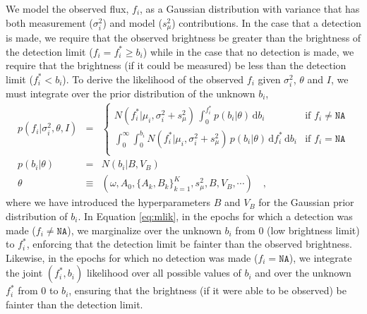 \documentclass[12pt,preprint]{aastex}
\newcommand{\dd}{\mathrm{d}}
\newcommand{\fobs}{f_i}
\newcommand{\ftrue}{f_i^*}
\begin{document}
We model the observed flux, $\fobs$, as a Gaussian distribution with variance that has both measurement ($\sigma^2_i$) and model ($s^2_{\mu}$) contributions.  In the case that a detection is made, we require that the observed brightness be greater than the brightness of the detection limit ($\fobs = \ftrue \ge b_i$) while in the case that no detection is made, we require that the brightness (if it could be measured) be less than the detection limit ($\ftrue < b_i$).  To derive the likelihood of the observed $\fobs$ given $\sigma^2_i$, $\theta$ and $I$, we must integrate over the prior distribution of the unknown $b_i$,
\begin{eqnarray}\displaystyle
p(\fobs |\sigma^2_i,\theta,I) &=& \left\{\begin{array}{ll}
  N(\ftrue | \mu_i,  \sigma^2_i + s^2_{\mu})\,  \int_0^{\ftrue} p(b_i | \theta)\, \dd b_i & \mbox{if $\fobs \ne \texttt{NA}$} \\
  \int_{0}^{\infty} \int_{0}^{b_i} N(\ftrue | \mu_i, \sigma^2_i + s^2_{\mu})\, p(b_i | \theta)\, \dd \ftrue\, \dd b_i & \mbox{if $\fobs = \texttt{NA}$} \\
\end{array}\right.\label{eq:mlik}
\\
p(b_i|\theta) &=& N(b_i|B,V_B)
\label{eq:bprior}
\\
\theta &\equiv& (\omega, A_0, \{A_k, B_k\}_{k=1}^K, s^2_\mu, B, V_B, \cdots) \quad ,
\end{eqnarray}
where we have introduced the hyperparameters $B$ and $V_B$ for the Gaussian prior distribution of $b_i$.  In Equation \ref{eq:mlik}, in the epochs for which a detection was made ($\fobs \ne \texttt{NA}$), we marginalize over the unknown $b_i$ from $0$ (low brightness limit) to $\ftrue$, enforcing that the detection limit be fainter than the observed brightness.  Likewise, in the epochs for which no detection was made ($\fobs = \texttt{NA}$), we integrate the joint $(\ftrue, b_i)$ likelihood over all possible values of $b_i$ and over the unknown $\ftrue$ from $0$ to $b_i$, ensuring that the brightness (if it were able to be observed) be fainter than the detection limit.
\end{document}
